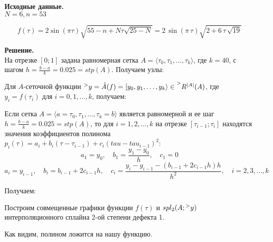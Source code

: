 \documentclass[14pt,a4paper]{scrartcl}
\begin{document}
\textbf{Исходные данные.}\\
$N = 6, n = 53$

\begin{equation*}
f(\tau) = 2 \sin (\pi \tau) \sqrt{55-n+N \tau \sqrt{25-N}} =2\,\sin \left( \pi\,\tau \right) \sqrt {2+6\,\tau\,\sqrt {19}}
\end{equation*}

\textbf{Решение.}\\
На отрезке $[0;1]$ задана равномерная сетка $A = \langle \tau_0, \tau_1, \ldots, \tau_k\rangle$, где $k=40$, с шагом $h = \frac{b-a}{k} = 0.025 = stp(A)$. Получаем узлы:

\begin{figure}[h]
\end{figure}


Для $A$-сеточной функции $\prescript{>}{}{y} = \hat{A}(f) = [y_0,y_1,\ldots,y_k\rangle \in \prescript{>}{}{R^{|A|}(A)}$, где $y_i=f(\tau_i)$ для $i=0,1,\ldots,k$, получаем:

\begin{figure}[h]
\end{figure}


Если сетка $A = \langle a=\tau_0, \tau_1, \ldots, \tau_k=b\rangle$ является равномерной и ее шаг $h = \frac{b-a}{k} = 0.025 = stp(A)$, то для $i=1,2,\ldots,k$ на отрезке $[\tau_{i-1};\tau_i]$ находятся значения коэффициентов полинома $p_i(\tau) = a_i + b_i(\tau-\tau_{i-1}) + c_i(tau-tau_{i-1})^2$:
\begin{equation*}
a_1 = y_0, \quad b_1 = \frac{y_1-y_0}{h}, \quad c_1 = 0
\end{equation*}
\begin{equation*}
a_i = y_{i-1}, \quad b_i = b_{i-1} + 2c_{i-1}h, \quad c_i = \frac{y_i - y_{i-1} - (b_{i-1} + 2c_{i-1}h)h}{h^2}, \quad i=2,3,\ldots,k
\end{equation*}

Получаем:
\begin{figure}[h]
\end{figure}

Построим совмещенные графики функции $f(\tau)$ и $spl_2(A;\prescript{>}{}{y})$ интерполяционного сплайна 2-ой степени дефекта 1.
\pagebreak

\begin{figure}[t]
\end{figure}
Как видим, полином ложится на нашу функцию.
\end{document}
